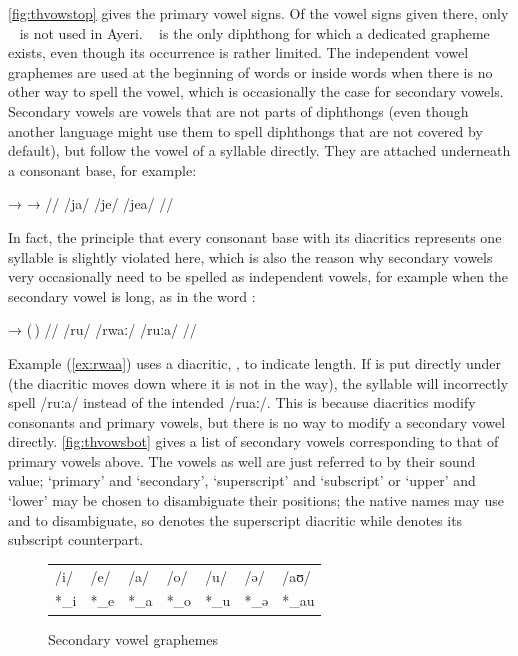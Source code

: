 \autoref{fig:thvowstop} gives the primary vowel signs. Of the vowel signs given 
there, only ~ is not used in Ayeri. ~ is the 
only diphthong for which a dedicated grapheme exists, even though its 
occurrence 
is rather limited. The independent vowel graphemes are used at the beginning of 
words or inside words when there is no other way to spell the vowel, which is 
occasionally the case for secondary vowels. Secondary vowels are vowels that 
are 
not parts of diphthongs (even though another language might use them to spell 
diphthongs that are not covered by default), but follow the vowel of a syllable 
directly. They are attached underneath a consonant base, for example:

\ex[lingstyle=thex]\begingl
	\gla {}	→		→	 //
	\glb /ja/	{}	/je/		{}	/jea/ //
\endgl\xe

In fact, the principle that every consonant base with its diacritics represents 
one syllable is slightly violated here, which is also the reason why secondary 
vowels very occasionally need to be spelled as independent vowels, for example 
when the secondary vowel is long, as in the word :

\ex[lingstyle=thex]\label{ex:rwaa}\begingl
	\gla {}	→		\quad	(\,) //
	\glb /ru/	{}	/rwaː/ 		\quad	/ruːa/ //
\endgl\xe

Example (\ref{ex:rwaa}) uses a diacritic, , to indicate length. If 
is put directly under  (the  diacritic moves down where 
it is not in the way), the syllable will incorrectly spell /ruːa/ instead of 
the intended /ruaː/. This is because diacritics modify consonants and primary 
vowels, but there is no way to modify a secondary vowel directly. 
\autoref{fig:thvowsbot} gives a list of secondary vowels corresponding to that 
of primary vowels above. The vowels as well are just referred to by their sound 
value; `primary' and `secondary', `superscript' and `subscript' or `upper' and 
`lower' may be chosen to disambiguate their positions; the native names may use 
 and  to disambiguate, so  denotes the superscript  diacritic while  denotes its subscript counterpart.

\begin{figure}[ht]
\caption{Secondary vowel graphemes}

\begin{tabu} to \linewidth{X[c] X[c] X[c] X[c] X[c] X[c] X[c]}
\toprule
\tableheaderfont	/i/ & /e/ & /a/ & /o/ & /u/ & /ə/ & /aʊ/ \\
\rowfont{\Tagati\huge}	*\_i & *\_e & *\_a & *\_o & *\_u & *\_ə & *\_au \\

\bottomrule
\end{tabu}
\label{fig:thvowsbot}
\end{figure}

